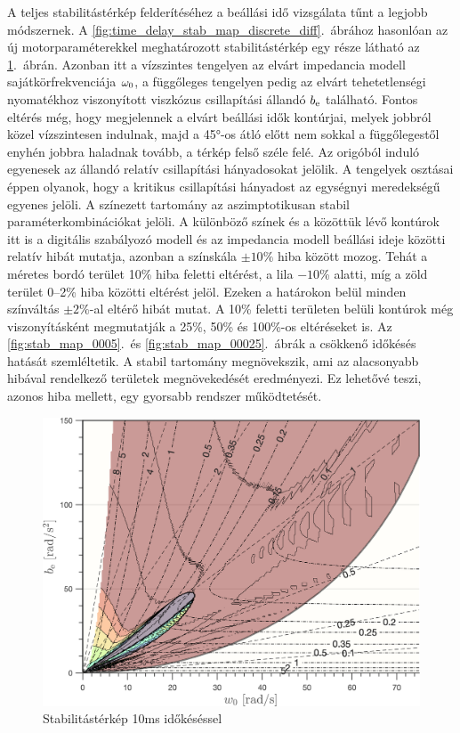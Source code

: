 A teljes stabilitástérkép felderítéséhez a beállási idő vizsgálata tűnt a legjobb módszernek.
A \ref{fig:time_delay_stab_map_discrete_diff}.~ábrához hasonlóan az új motorparaméterekkel meghatározott stabilitástérkép egy része látható az \ref{fig:stab_map_001}.~ábrán.
Azonban itt a vízszintes tengelyen az elvárt impedancia modell sajátkörfrekvenciája \(\omega_{\mathrm{0}}\), a függőleges 
tengelyen pedig az elvárt tehetetlenségi nyomatékhoz viszonyított viszkózus csillapítási állandó \(b_{\mathrm{e}}\) található.
Fontos eltérés még, hogy megjelennek a elvárt beállási idők kontúrjai, melyek jobbról közel vízszintesen indulnak, 
majd a 45°-os átló előtt nem sokkal a függőlegestől enyhén jobbra haladnak tovább, a térkép felső széle felé. 
Az origóból induló egyenesek az állandó relatív csillapítási hányadosokat jelölik. A tengelyek osztásai éppen olyanok, 
hogy a kritikus csillapítási hányadost az egységnyi meredekségű egyenes jelöli. A színezett tartomány az aszimptotikusan 
stabil paraméterkombinációkat jelöli. A különböző színek és a közöttük lévő kontúrok itt is a digitális szabályozó modell és az 
impedancia modell beállási ideje közötti relatív hibát mutatja, azonban a színskála \(\pm 10\%\) hiba között mozog. 
Tehát a méretes bordó terület 10\% hiba feletti eltérést, a lila $-10$\% alatti, míg a zöld terület 0--2\% hiba közötti 
eltérést jelöl. Ezeken a határokon belül minden színváltás \(\pm2\%\)-al eltérő hibát mutat. A 10\% feletti 
területen belüli kontúrok még viszonyításként megmutatják a 25\%, 50\% és 100\%-os eltéréseket is. 
Az \ref{fig:stab_map_0005}.~és \ref{fig:stab_map_00025}.~ábrák a csökkenő időkésés hatását szemléltetik. 
A stabil tartomány megnövekszik, ami az alacsonyabb hibával rendelkező területek 
megnövekedését eredményezi. Ez lehetővé teszi, azonos hiba mellett, egy gyorsabb rendszer működtetését. 

\begin{figure}[b!]
    \begin{center}
    \includegraphics[width=14cm]{images/stab_map_001.png}
    \caption{Stabilitástérkép 10ms időkéséssel}\label{fig:stab_map_001}
    \end{center}
\end{figure}

